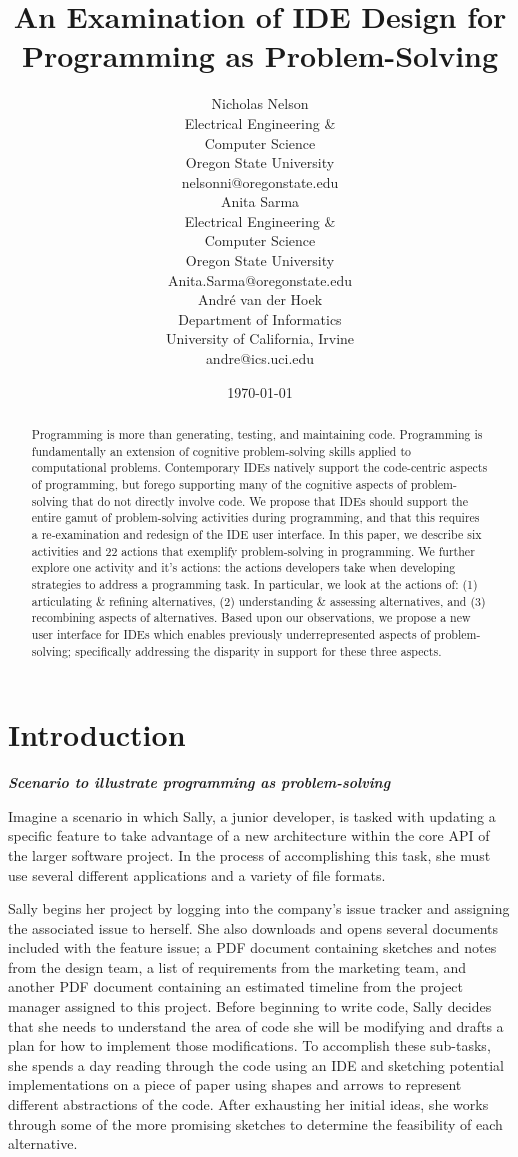 \documentclass{ppig}
\title{An Examination of IDE Design for Programming as Problem-Solving}
\author{Nicholas Nelson \\
  Electrical Engineering \&\\ Computer Science \\
  Oregon State University \\
  nelsonni@oregonstate.edu \\
  \And
  Anita Sarma \\
  Electrical Engineering \&\\ Computer Science \\
  Oregon State University \\
  Anita.Sarma@oregonstate.edu \\
  \And
  André van der Hoek \\
  Department of Informatics \\
  University of California, Irvine \\
  andre@ics.uci.edu
}
\date{\today}
\newcommand{\bold}[1]{\textit{\textbf{\color{aoblue}#1}}} %
\begin{document}
\maketitle
\thispagestyle{empty}

\begin{abstract}

Programming is more than generating, testing, and maintaining code.
Programming is fundamentally an extension of cognitive problem-solving skills applied to computational problems.
Contemporary IDEs natively support the code-centric aspects of programming, but forego supporting many of the cognitive aspects of problem-solving that do not directly involve code.
We propose that IDEs should support the entire gamut of problem-solving activities during programming, and that this requires a re-examination and redesign of the IDE user interface.
In this paper, we describe six activities and 22 actions that exemplify problem-solving in programming.
We further explore one activity and it's actions: the actions developers take when developing strategies to address a programming task.
In particular, we look at the actions of: (1) articulating \& refining alternatives, (2) understanding \& assessing alternatives, and (3) recombining aspects of alternatives.
Based upon our observations, we propose a new user interface for IDEs which enables previously underrepresented aspects of problem-solving; specifically addressing the disparity in support for these three aspects. 
\end{abstract}

\section{Introduction}
\bold{Scenario to illustrate programming as problem-solving}\vspace*{-0.4\baselineskip}

Imagine a scenario in which Sally, a junior developer, is tasked with updating a specific feature to take advantage of a new architecture within the core API of the larger software project. In the process of accomplishing this task, she must use several different applications and a variety of file formats.

Sally begins her project by logging into the company's issue tracker and assigning the associated issue to herself.
She also downloads and opens several documents included with the feature issue; a PDF document containing sketches and notes from the design team, a list of requirements from the marketing team, and another PDF document containing an estimated timeline from the project manager assigned to this project.
Before beginning to write code, Sally decides that she needs to understand the area of code she will be modifying and drafts a plan for how to implement those modifications.
To accomplish these sub-tasks, she spends a day reading through the code using an IDE and sketching potential implementations on a piece of paper using shapes and arrows to represent different abstractions of the code.
After exhausting her initial ideas, she works through some of the more promising sketches to determine the feasibility of each alternative.
\end{document}
